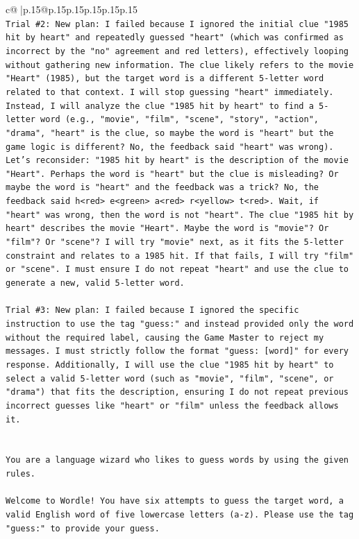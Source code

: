 \documentclass{article}
\begin{document}
{\begin{supertabular}{c@{$\;$}|p{.15\linewidth}@{}p{.15\linewidth}p{.15\linewidth}p{.15\linewidth}p{.15\linewidth}p{.15\linewidth}}
{{{\\ 
\texttt{Trial \#2: New plan: I failed because I ignored the initial clue "1985 hit by heart" and repeatedly guessed "heart" (which was confirmed as incorrect by the "no" agreement and red letters), effectively looping without gathering new information. The clue likely refers to the movie "Heart" (1985), but the target word is a different 5{-}letter word related to that context. I will stop guessing "heart" immediately. Instead, I will analyze the clue "1985 hit by heart" to find a 5{-}letter word (e.g., "movie", "film", "scene", "story", "action", "drama", "heart" is the clue, so maybe the word is "heart" but the game logic is different? No, the feedback said "heart" was wrong). Let's reconsider: "1985 hit by heart" is the description of the movie "Heart". Perhaps the word is "heart" but the clue is misleading? Or maybe the word is "heart" and the feedback was a trick? No, the feedback said h<red> e<green> a<red> r<yellow> t<red>. Wait, if "heart" was wrong, then the word is not "heart". The clue "1985 hit by heart" describes the movie "Heart". Maybe the word is "movie"? Or "film"? Or "scene"? I will try "movie" next, as it fits the 5{-}letter constraint and relates to a 1985 hit. If that fails, I will try "film" or "scene". I must ensure I do not repeat "heart" and use the clue to generate a new, valid 5{-}letter word.} \\
\\ 
\texttt{Trial \#3: New plan: I failed because I ignored the specific instruction to use the tag "guess:" and instead provided only the word without the required label, causing the Game Master to reject my messages. I must strictly follow the format "guess: {[}word{]}" for every response. Additionally, I will use the clue "1985 hit by heart" to select a valid 5{-}letter word (such as "movie", "film", "scene", or "drama") that fits the description, ensuring I do not repeat previous incorrect guesses like "heart" or "film" unless the feedback allows it.} \\
\\ 
\\ 
\texttt{You are a language wizard who likes to guess words by using the given rules.} \\
\\ 
\texttt{Welcome to Wordle! You have six attempts to guess the target word, a valid English word of five lowercase letters (a{-}z). Please use the tag "guess:" to provide your guess.} \\
\\ 
}}}
\end{supertabular}}
\end{document}
